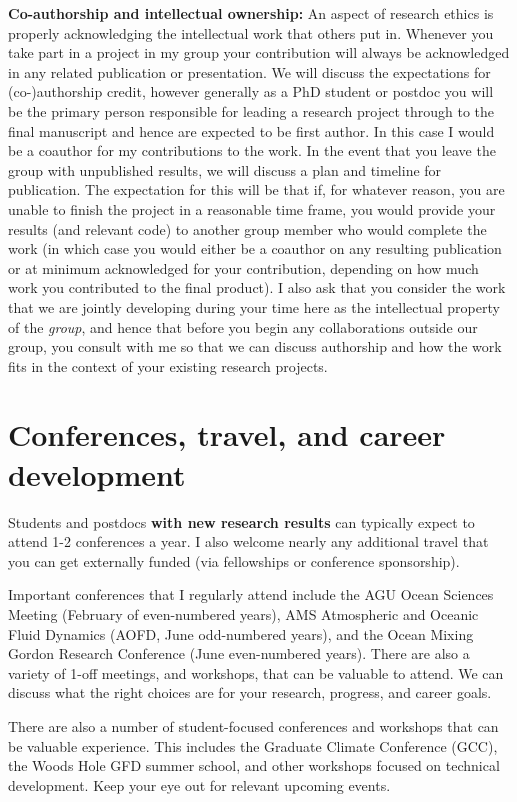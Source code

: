 \documentclass{classassignments}
\begin{document}
\noindent\textbf{Co-authorship and intellectual ownership:} An aspect of research ethics is properly acknowledging the intellectual work that others put in. Whenever you take part in a project in my group your contribution will always be acknowledged in any related publication or presentation. We will discuss the expectations for (co-)authorship credit, however generally as a PhD student or postdoc you will be the primary person responsible for leading a research project through to the final manuscript and hence are expected to be first author. In this case I would be a coauthor for my contributions to the work. In the event that you leave the group with unpublished results, we will discuss a plan and timeline for publication. The expectation for this will be that if, for whatever reason, you are unable to finish the project in a reasonable time frame, you would provide your results (and relevant code) to another group member who would complete the work (in which case you would either be a coauthor on any resulting publication or at minimum acknowledged for your contribution, depending on how much work you contributed to the final product). I also ask that you consider the work that we are jointly developing during your time here as the intellectual property of the \textit{group}, and hence that before you begin any collaborations outside our group, you consult with me so that we can discuss authorship and how the work fits in the context of your existing research projects.


\section{Conferences, travel, and career development}
Students and postdocs \textbf{with new research results} can typically expect to attend 1-2 conferences a year. I also welcome nearly any additional travel that you can get externally funded (via fellowships or conference sponsorship).\medskip

Important conferences that I regularly attend include the AGU Ocean Sciences Meeting (February of even-numbered years), AMS Atmospheric and Oceanic Fluid Dynamics (AOFD, June odd-numbered years), and the Ocean Mixing Gordon Research Conference (June even-numbered years). There are also a variety of 1-off meetings, and workshops, that can be valuable to attend. We can discuss what the right choices are for your research, progress, and career goals.\medskip

There are also a number of student-focused conferences and workshops that can be valuable experience. This includes the Graduate Climate Conference (GCC), the Woods Hole GFD summer school, and other workshops focused on technical development. Keep your eye out for relevant upcoming events. \medskip
\end{document}
